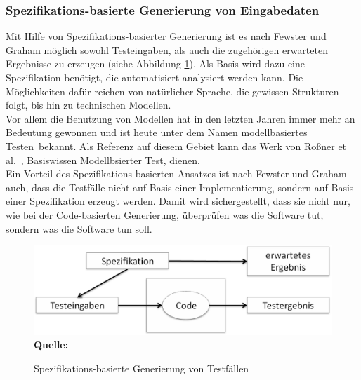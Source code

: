 \subsubsection{Spezifikations-basierte Generierung von Eingabedaten}
\label{subsubsec:spezifikationsbasierte_generierung}
Mit Hilfe von Spezifikations-basierter Generierung ist es nach Fewster und Graham \cite[vgl. S. 21]{fewster_software_1999} möglich sowohl Testeingaben, als auch die zugehörigen erwarteten Ergebnisse zu erzeugen (siehe Abbildung \ref{fig:specBasedDesign}). Als Basis wird dazu eine Spezifikation benötigt, die automatisiert analysiert werden kann. Die Möglichkeiten dafür reichen von natürlicher Sprache, die gewissen Strukturen folgt, bis hin zu technischen Modellen.\\ Vor allem die Benutzung von Modellen hat in den letzten Jahren immer mehr an Bedeutung gewonnen und ist heute unter dem Namen \grq modellbasiertes Testen\grq\ bekannt. Als Referenz auf diesem Gebiet kann das Werk von Roßner et al.\ \cite{rossner_basiswissen_2010}, \glqq Basiswissen Modellbsierter Test\grqq, dienen.\\
Ein Vorteil des Spezifikations-basierten Ansatzes ist nach Fewster und Graham \cite[vgl. S. 21]{fewster_software_1999} auch, dass die Testfälle nicht auf Basis einer Implementierung, sondern auf Basis einer Spezifikation erzeugt werden. Damit wird sichergestellt, dass sie nicht nur, wie bei der Code-basierten Generierung, überprüfen \grq was die Software tut\grq , sondern \grq was die Software tun soll\grq.

\begin{figure}[htb]
  \centering  
  \includegraphics[scale=0.6]{img/specBasedDesign.png}\\
  \footnotesize\sffamily\textbf{Quelle:} \cite[vgl. S. 21]{fewster_software_1999}
  \caption{Spezifikations-basierte Generierung von Testfällen}
  \label{fig:specBasedDesign}
\end{figure}

